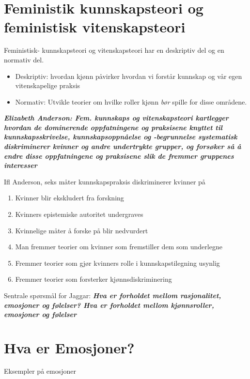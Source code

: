 \documentclass[11pt, a4paper]{article}
\begin{document}
\section{Feministik kunnskapsteori og feministisk vitenskapsteori}


Feministisk- kunnskapsteori og vitenskapsteori har en deskriptiv del og en normativ del.

\begin{itemize}
    \item Deskriptiv: hvordan kjønn påvirker hvordan vi forstår kunnskap og vår egen vitenskapelige praksis
    \item Normativ: Utvikle teorier om hvilke roller kjønn \textit{bør} spille for disse områdene.
\end{itemize}


\textbf{\textit{Elizabeth Anderson: Fem. kunnskaps og vitenskapsteori kartlegger hvordan de dominerende oppfatningene og praksisene knyttet til kunnskapsskrivelse, kunnskapsoppnåelse og -begrunnelse systematisk diskriminerer kvinner og andre undertrykte grupper, og forsøker så å endre disse oppfatningene og praksisene slik de fremmer gruppenes interesser}}

Ifl Anderson, seks måter kunnskapspraksis diskriminerer kvinner på

\begin{enumerate}
    \item Kvinner blir ekskludert fra forskning
    \item Kvinners epistemiske autoritet undergraves
    \item Kvinnelige måter å forske på blir nedvurdert
    \item Man fremmer teorier om kvinner som fremstiller dem som underlegne
    \item Fremmer teorier som gjør kvinners rolle i kunnskapstilegning usynlig
    \item Fremmer teorier som forsterker kjønnsdiskriminering
\end{enumerate}


Sentrale spørsmål for Jaggar: \textbf{\textit{Hva er forholdet mellom rasjonalitet, emosjoner og følelser? Hva er forholdet mellom kjønnsroller, emosjoner og følelser}}


\section{Hva er Emosjoner?}


Eksempler på emosjoner
\end{document}
